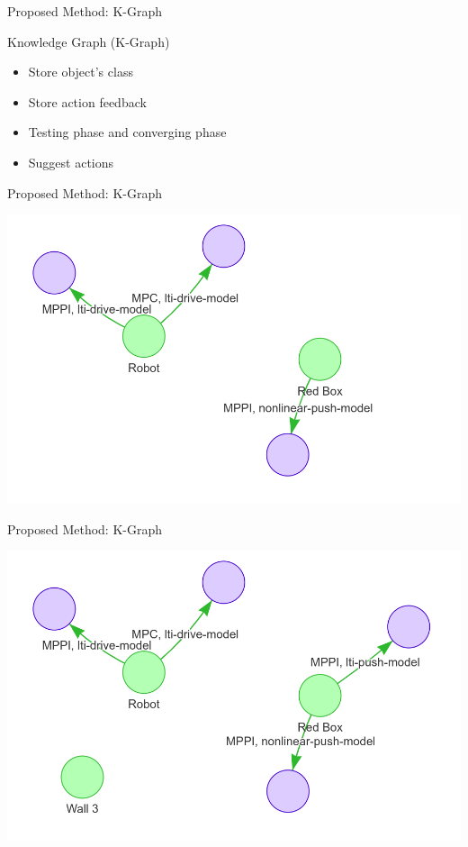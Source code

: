 \begin{frame}[fragile]{Proposed Method: K-Graph} 
\begin{block}{Knowledge Graph (K-Graph)}
    \begin{itemize}
      \item Store object's class
      \item Store action feedback
      \item Testing phase and converging phase
      \item Suggest actions
    \end{itemize}
  \end{block}
\end{frame}

\begin{frame}[fragile]{Proposed Method: K-Graph} 
  \begin{center}
    \includegraphics[height=0.9\textheight]{figures/proposed_method/kgraph_testing_phase}
  \end{center}
\end{frame}

\begin{frame}[fragile]{Proposed Method: K-Graph} 
  \begin{center}
    \includegraphics[height=0.9\textheight]{figures/proposed_method/kgraph_converging_phase}
  \end{center}
\end{frame}

